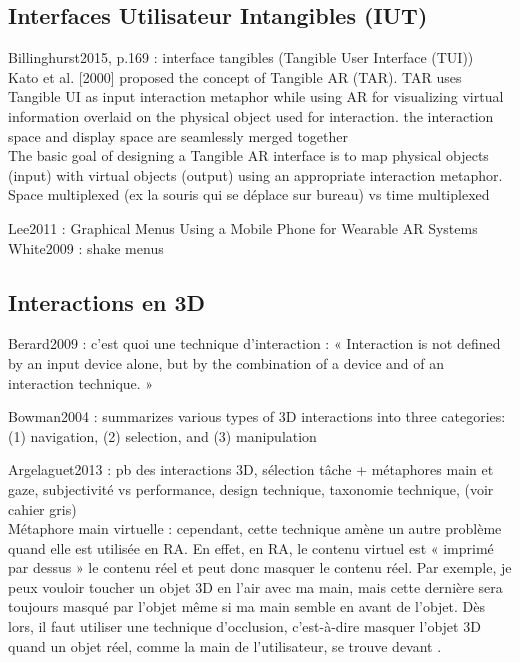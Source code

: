 \subsection{Interfaces Utilisateur Intangibles (IUT)}
Billinghurst2015, p.169 : interface tangibles (Tangible User Interface (TUI))\\
Kato et al. [2000] proposed the concept of Tangible AR (TAR). TAR uses Tangible UI as input interaction metaphor while using AR for visualizing virtual information overlaid on the physical object used for interaction. the interaction space and display space are seamlessly merged together\\
The basic goal of designing a Tangible AR interface is to map physical objects (input) with virtual objects (output) using an appropriate interaction metaphor.\\
Space multiplexed (ex la souris qui se déplace sur bureau) vs time multiplexed

Lee2011 : Graphical Menus Using a Mobile Phone for Wearable AR Systems\\
White2009 : shake menus

\subsection{Interactions en 3D}
Berard2009 : c'est quoi une technique d'interaction : « Interaction is not defined by an input device alone, but by the combination of a device and of an interaction technique. »

Bowman2004 : summarizes various types of 3D interactions into three categories: (1) navigation, (2) selection, and (3)
manipulation

Argelaguet2013 : pb des interactions 3D, sélection tâche + métaphores main et gaze, subjectivité vs performance, design technique, taxonomie technique,  (voir cahier gris)\\
Métaphore main virtuelle : cependant, cette technique amène un autre problème quand elle est utilisée en RA. En effet, en RA, le contenu virtuel est « imprimé par dessus » le contenu réel et peut donc masquer le contenu réel. Par exemple, je peux vouloir toucher un objet 3D en l'air avec ma main, mais cette dernière sera toujours masqué par l'objet même si ma main semble en avant de l'objet. Dès lors, il faut utiliser une technique d'occlusion, c'est-à-dire masquer l'objet 3D quand un objet réel, comme la main de l'utilisateur, se trouve devant .


